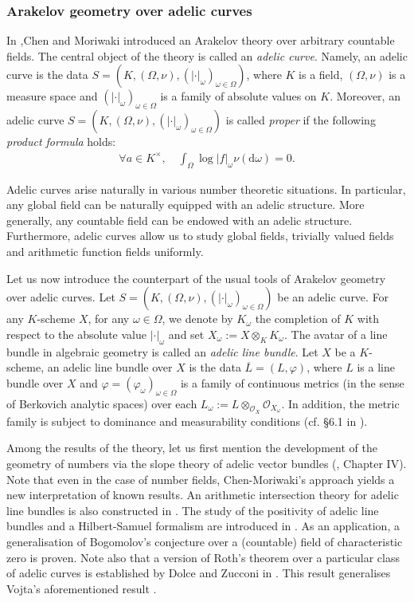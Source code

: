 \documentclass [11pt,reqno]{amsart}
\newcommand{\1}{\mathmybb{1}}
\def\cO{{\mathcal{O}}}
\def\diff{\mathrm{d}}
\newcommand{\va}{|\cdot|}
\begin{document}
\subsubsection*{Arakelov geometry over adelic curves}

In \cite{ChenMori},Chen and Moriwaki introduced an Arakelov theory over arbitrary countable fields. The central object of the theory is called an \emph{adelic curve}. Namely, an adelic curve is the data $S=(K,(\Omega,\nu),(\va_{\omega})_{\omega\in\Omega})$, where $K$ is a field, $(\Omega,\nu)$ is a measure space and $(\va_{\omega})_{\omega\in\Omega}$ is a family of absolute values on $K$. Moreover, an adelic curve $S=(K,(\Omega,\nu),(\va_{\omega})_{\omega\in\Omega})$ is called \emph{proper} if the following \emph{product formula} holds:
\begin{align*}
\forall a\in K^{\times},\quad \int_{\Omega}\log|f|_{\omega}\nu(\diff\omega)=0.
\end{align*}

Adelic curves arise naturally in various number theoretic situations. In particular, any global field can be naturally equipped with an adelic structure. More generally, any countable field can be endowed with an adelic structure. Furthermore, adelic curves allow us to study global fields, trivially valued fields and arithmetic function fields uniformly.

Let us now introduce the counterpart of the usual tools of Arakelov geometry over adelic curves. Let $S=(K,(\Omega,\nu),(\va_{\omega})_{\omega\in\Omega})$ be an adelic curve. For any $K$-scheme $X$, for any $\omega\in\Omega$, we denote by $K_{\omega}$ the completion of $K$ with respect to the absolute value $|\cdot|_{\omega}$ and set $X_{\omega} := X \otimes_{K} K_{\omega}$. The avatar of a line bundle in algebraic geometry is called an \emph{adelic line bundle}. Let $X$ be a $K$-scheme, an adelic line bundle over $X$ is the data $\overline{L}=(L,\varphi)$, where $L$ is a line bundle over $X$ and $\varphi=(\varphi_{\omega})_{\omega\in\Omega}$ is a family of continuous metrics (in the sense of Berkovich analytic spaces) over each $L_{\omega} := L \otimes_{\cO_X} \cO_{X_\omega}$. In addition, the metric family is subject to dominance and measurability conditions (cf. \S 6.1 in \cite{ChenMori}).

Among the results of the theory, let us first mention the development of the geometry of numbers via the slope theory of adelic vector bundles (\cite{ChenMori}, Chapter IV). Note that even in the case of number fields, Chen-Moriwaki's approach yields a new interpretation of known results. An arithmetic intersection theory for adelic line bundles is also constructed in \cite{ChenMori21}. The study of the positivity of adelic line bundles and a Hilbert-Samuel formalism are introduced in \cite{ChenMori24}. As an application, a generalisation of Bogomolov's conjecture over a (countable) field of characteristic zero is proven. Note also that a version of Roth's theorem over a particular class of adelic curves is established by Dolce and Zucconi in \cite{DolceZucconi25}. This result generalises Vojta's aforementioned result \cite{Vojta21}.
\end{document}
